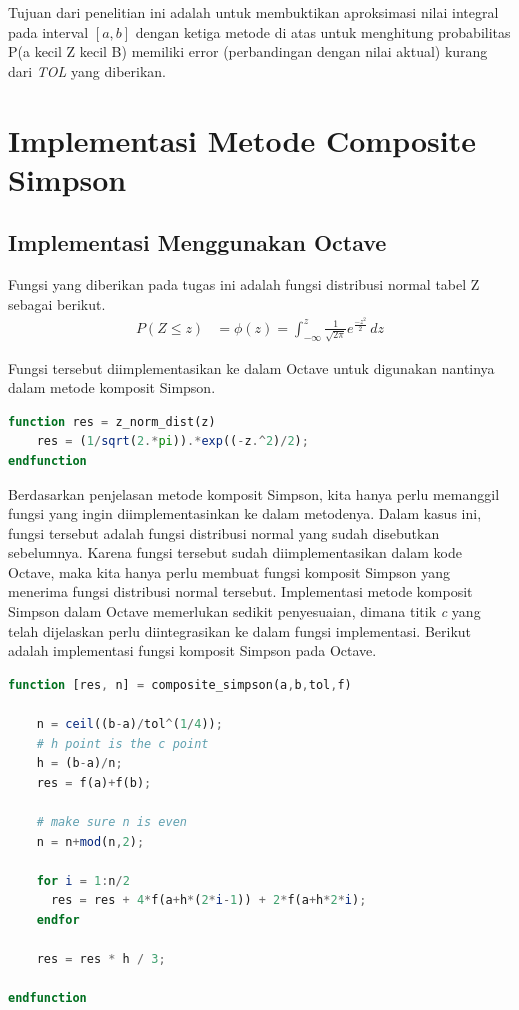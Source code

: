 \documentclass[journal,12pt,onecolumn,a4paper]{IEEEtran}
\begin{document}
Tujuan dari penelitian ini adalah untuk membuktikan aproksimasi nilai integral pada interval \([a, b]\) dengan ketiga metode di atas untuk menghitung probabilitas P(a kecil Z kecil B) memiliki error (perbandingan dengan nilai aktual) kurang dari \emph{TOL} yang diberikan.

\section{Implementasi Metode Composite Simpson}

\subsection{Implementasi Menggunakan Octave}

\par Fungsi yang diberikan pada tugas ini adalah fungsi distribusi normal tabel Z sebagai berikut.
\begin{equation*}
	\begin{split}
		P(Z \le z ) & = \phi(z) = \int_{-\infty}^{z} \frac{1}{\sqrt{2\pi}}e ^{\frac{-z^2}{2}} \,dz
	\end{split}
\end{equation*}

Fungsi tersebut diimplementasikan ke dalam Octave untuk digunakan nantinya dalam metode komposit Simpson.

\begin{center}
	\begin{lstlisting}[language=Octave]
function res = z_norm_dist(z)
	res = (1/sqrt(2.*pi)).*exp((-z.^2)/2);
endfunction
	\end{lstlisting}
\end{center}

Berdasarkan penjelasan metode komposit Simpson, kita hanya perlu memanggil fungsi yang ingin diimplementasinkan ke dalam metodenya. Dalam kasus ini, fungsi tersebut adalah fungsi distribusi normal yang sudah disebutkan sebelumnya. Karena fungsi tersebut sudah diimplementasikan dalam kode Octave, maka kita hanya perlu membuat fungsi komposit Simpson yang menerima fungsi distribusi normal tersebut. Implementasi metode komposit Simpson dalam Octave memerlukan sedikit penyesuaian, dimana titik \emph{c} yang telah dijelaskan perlu diintegrasikan ke dalam fungsi implementasi. Berikut adalah implementasi fungsi komposit Simpson pada Octave.

\begin{center}
	\begin{lstlisting}[language=Octave]
function [res, n] = composite_simpson(a,b,tol,f)

	n = ceil((b-a)/tol^(1/4));
	# h point is the c point
	h = (b-a)/n;
	res = f(a)+f(b);
	 
	# make sure n is even
	n = n+mod(n,2);
	 
	for i = 1:n/2
	  res = res + 4*f(a+h*(2*i-1)) + 2*f(a+h*2*i);
	endfor
	 
	res = res * h / 3;
	 
endfunction
	\end{lstlisting}
\end{center}
\end{document}
